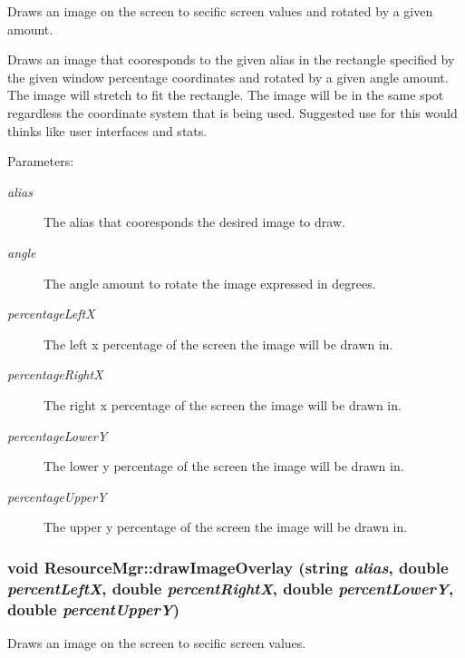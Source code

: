 Draws an image on the screen to secific screen values and rotated by a given amount. 

Draws an image that cooresponds to the given alias in the rectangle specified by the given window percentage coordinates and rotated by a given angle amount. The image will stretch to fit the rectangle. The image will be in the same spot regardless the coordinate system that is being used. Suggested use for this would thinks like user interfaces and stats. \begin{Desc}
\item[Parameters:]
\begin{description}
\item[{\em alias}]The alias that cooresponds the desired image to draw. \item[{\em angle}]The angle amount to rotate the image expressed in degrees. \item[{\em percentageLeftX}]The left x percentage of the screen the image will be drawn in. \item[{\em percentageRightX}]The right x percentage of the screen the image will be drawn in. \item[{\em percentageLowerY}]The lower y percentage of the screen the image will be drawn in. \item[{\em percentageUpperY}]The upper y percentage of the screen the image will be drawn in. \end{description}
\end{Desc}
\hypertarget{class_resource_mgr_69697bb29673dc8ef6a582901d456807}{
\subsubsection[{drawImageOverlay}]{\setlength{\rightskip}{0pt plus 5cm}void ResourceMgr::drawImageOverlay (string {\em alias}, \/  double {\em percentLeftX}, \/  double {\em percentRightX}, \/  double {\em percentLowerY}, \/  double {\em percentUpperY})}}
\label{class_resource_mgr_69697bb29673dc8ef6a582901d456807}


Draws an image on the screen to secific screen values. 

